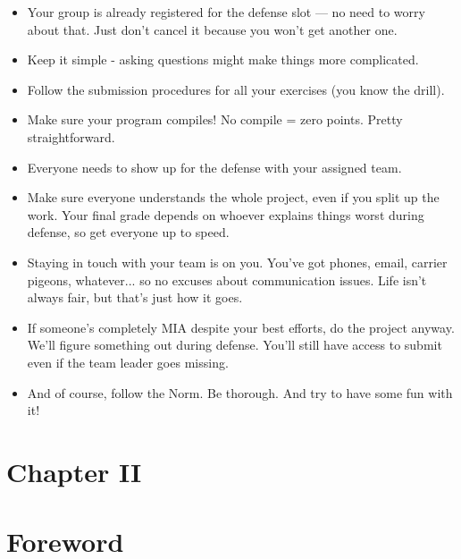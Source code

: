 \documentclass[12pt]{article}
\begin{document}
\begin{itemize}
  \item Your group is already registered for the defense slot — no need to worry about that. Just don't cancel it because you won't get another one.
  \item Keep it simple - asking questions might make things more complicated.
  \item Follow the submission procedures for all your exercises (you know the drill).
  \item Make sure your program compiles! No compile = zero points. Pretty straightforward.
  \item Everyone needs to show up for the defense with your assigned team.
  \item Make sure everyone understands the whole project, even if you split up the work. Your final grade depends on whoever explains things worst during defense, so get everyone up to speed.
  \item Staying in touch with your team is on you. You've got phones, email, carrier pigeons, whatever... so no excuses about communication issues. Life isn't always fair, but that's just how it goes.
  \item If someone's completely MIA despite your best efforts, do the project anyway. We'll figure something out during defense. You'll still have access to submit even if the team leader goes missing.
  \item And of course, follow the Norm. Be thorough. And try to have some fun with it!
\end{itemize}

\newpage

\section*{\LARGE Chapter II}
\section*{\LARGE Foreword}
\end{document}
